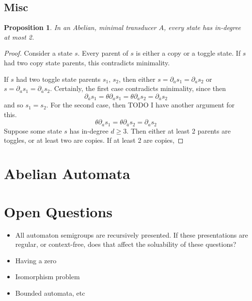 \documentclass[10pt]{article}
\newtheorem{proposition}{Proposition}
\begin{document}
\subsection{Misc}

\begin{proposition}
  In an Abelian, minimal transducer $A$, every state has in-degree at
  most 2.
\end{proposition}
\begin{proof}
  Consider a state $s$. Every parent of $s$ is either a copy or a
  toggle state. If $s$ had two copy state parents, this contradicts
  minimality.

  If $s$ had two toggle state parents $s_1$, $s_2$, then either
  $s = \partial_a s_1 = \partial_a s_2$ or
  $s = \partial_a s_1 = \partial_{\bar{a}} s_2$. Certainly, the first
  case contradicts minimality, since then
  $$ \partial_{\bar{a}} s_1 = \theta \partial_a s_1 = \theta
  \partial_a s_2 = \partial_{\bar{a}} s_2$$ and so $s_1 = s_2$.  For
  the second case, then TODO I have another argument for this.
  $$ \theta \partial_{a} s_1 = \theta \partial_{\bar{a}} s_2 =
  \partial_a s_2 $$ Suppose some state $s$ has in-degree $d \geq
  3$. Then either at least 2 parents are toggles, or at least two are
  copies. If at least 2 are copies,
    \end{proof}

\section{Abelian Automata}

\section{Open Questions}

\begin{itemize}
\item All automaton semigroups are recursively presented. If these
  presentations are regular, or context-free, does that affect the
  soluability of these questions?
\item Having a zero
\item Isomorphism problem
\item Bounded automata, etc
\end{itemize}

\nocite{*}

\end{document}
